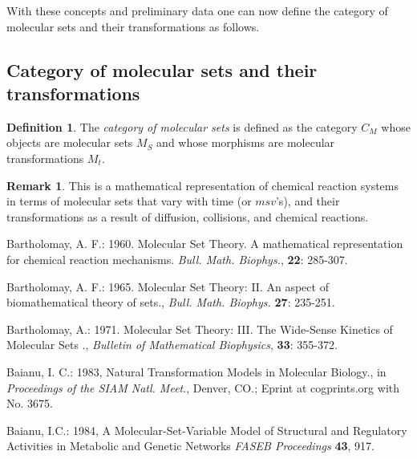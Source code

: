 \documentclass[12pt]{article}
\theoremstyle{plain}
\theoremstyle{definition}
\newtheorem{definition}{Definition}[section]
\newtheorem{remark}{Remark}[section]
\numberwithin{equation}{section}
\begin{document}
 With these concepts and preliminary data one can now define the category of molecular sets and their transformations 
as follows.

\subsection{Category of molecular sets and their transformations}
\begin{definition}
 The \emph{category of molecular sets} is defined as the category $C_M$ whose objects are molecular sets $M_S$ and whose morphisms are molecular transformations $M_t$. 
\end{definition}

\begin{remark}
 This is a mathematical representation of chemical reaction systems in terms of molecular sets that vary with time 
(or $msv$'s), and their transformations as a result of diffusion, collisions, and chemical reactions. 
\end{remark}

\begin{thebibliography}{9}

Bartholomay, A. F.: 1960. Molecular Set Theory. A mathematical representation for chemical reaction mechanisms. \emph{Bull. Math. Biophys.}, \textbf{22}: 285-307.

Bartholomay, A. F.: 1965. Molecular Set Theory: II. An aspect of biomathematical theory of sets., \emph{Bull. Math. Biophys.} \textbf{27}: 235-251.

Bartholomay, A.: 1971. Molecular Set Theory: III. The Wide-Sense Kinetics of Molecular Sets ., \emph{Bulletin of Mathematical Biophysics}, \textbf{33}: 355-372.

Baianu, I. C.: 1983, Natural Transformation Models in Molecular
Biology., in \emph{Proceedings of the SIAM Natl. Meet}., Denver,
CO.; Eprint at cogprints.org with No. 3675.

Baianu, I.C.: 1984, A Molecular-Set-Variable Model of Structural
and Regulatory Activities in Metabolic and Genetic Networks
\emph{FASEB Proceedings} \textbf{43}, 917.

\end{thebibliography}

\end{document}
